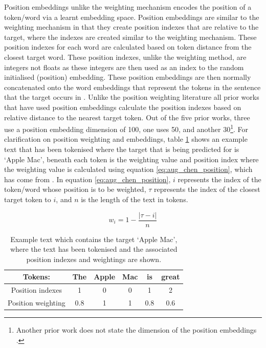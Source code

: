 Position embeddings unlike the weighting mechanism encodes the position of a token/word via a learnt embedding space. Position embeddings are similar to the weighting mechanism in that they create position indexes that are relative to the target, where the indexes are created similar to the weighting mechanism. These position indexes for each word are calculated based on token distance from the closest target word. These position indexes, unlike the weighting method, are integers not floats as these integers are then used as an index to the random initialised (position) embedding. These position embeddings are then normally concatenated onto the word embeddings that represent the tokens in the sentence that the target occurs in \citep{gu-etal-2018-position, li-etal-2018-hierarchical, chen-qian-2019-transfer, sun-etal-2019-aspect, kumar2020aspect}. Unlike the position weighting literature all prior works that have used position embeddings calculate the position indexes based on relative distance to the nearest target token. Out of the five prior works, three use a position embedding dimension of 100, one uses 50, and another 30\footnote{Another prior work does not state the dimension of the position embeddings \citep{du-etal-2019-capsule}.}.  For clarification on position weighting and embeddings, table \ref{tab:aug_examples_position_indexes_weighting} shows an example text that has been tokenised where the target that is being predicted for is `Apple Mac', beneath each token is the weighting value and position index where the weighting value is calculated using equation \ref{eq:aug_chen_position}, which has come from \citet{chen-etal-2017-recurrent}. In equation \ref{eq:aug_chen_position}, $i$ represents the index of the token/word whose position is to be weighted, $\tau$ represents the index of the closest target token to $i$, and $n$ is the length of the text in tokens. 

\begin{equation}
    w_i = 1 - \frac{|\tau - i|}{n}
    \label{eq:aug_chen_position}
\end{equation}

\begin{table}[!h]
    \centering
    \begin{tabular}{|c|c|c|c|c|c|}
    \hline
         Tokens: & The & Apple & Mac & is & great  \\
    \hline
         Position indexes & 1 & 0 & 0 & 1 & 2 \\
    \hline
         Position weighting & 0.8 & 1 & 1 & 0.8 & 0.6 \\
    \hline
    \end{tabular}
    \caption{Example text which contains the target `Apple Mac', where the text has been tokenised and the associated position indexes and weightings are shown.}
    \label{tab:aug_examples_position_indexes_weighting}
\end{table}

